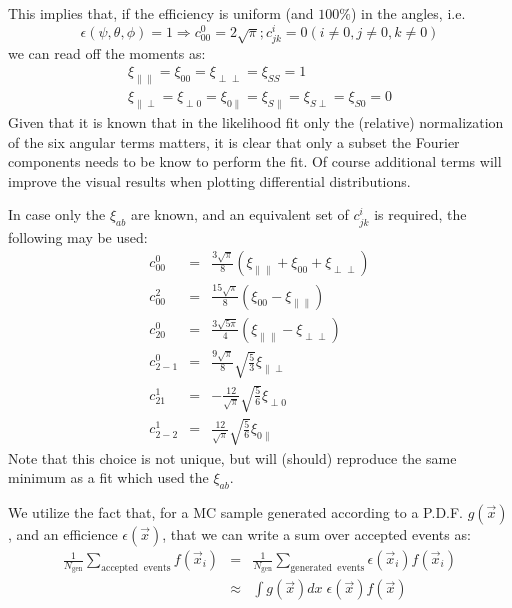 \documentclass[a4paper,10pt,twosided]{article}
\begin{document}
This implies that, if the efficiency is uniform (and $100\%$) in the angles, i.e.
\begin{equation}
   \epsilon(\psi,\theta,\phi) = 1 \Rightarrow c^0_{00} = 2\sqrt{\pi} ; c^{i}_{jk} = 0 (i\neq 0, j\neq 0, k \neq 0)
\end{equation}
we can read off the moments as:
\begin{eqnarray}
    \xi_{\parallel\parallel} = \xi_{00}= \xi_{\perp\perp} = \xi_{SS} = 1\\
    \xi_{\parallel\perp} =\xi_{\perp 0} = \xi_{0\parallel} =\xi_{S \parallel} = \xi_{S \perp} = \xi_{S 0} =0
\end{eqnarray}
Given that it is known that  in the likelihood fit only the (relative) normalization of the six angular
terms matters, it is clear that only a subset the Fourier components needs to be know to
perform the fit. Of course additional terms will improve the visual results when plotting 
differential distributions.

In case only the $\xi_{ab}$ are known, and an equivalent set of $c^i_{jk}$ is required, the 
following may be used:
\begin{eqnarray}
 c^0_{00}  &=& \frac{3\sqrt{\pi}}{8}( \xi_{\parallel \parallel }+\xi_{00}+\xi_{\perp\perp} )     \\
 c^2_{00}  &=& \frac{15\sqrt{\pi}}{8}( \xi_{00} - \xi_{\parallel \parallel } )    \\
 c^0_{20}  &=& \frac{3\sqrt{5\pi}}{4} ( \xi_{\parallel \parallel } - \xi_{\perp\perp} )    \\
 c^0_{2-1} &=& \frac{9\sqrt{\pi}}{8}\sqrt{\frac{5}{3}}  \xi_{\parallel \perp}    \\
 c^1_{21}  &=& - \frac{12}{\sqrt{\pi}}\sqrt{\frac{5}{6}} \xi_{\perp0}    \\
 c^1_{2-2} &=&   \frac{12}{\sqrt{\pi}}\sqrt{\frac{5}{6}}  \xi_{0\parallel }
\end{eqnarray}
Note that this choice is not unique, but will (should)  reproduce the same minimum as a fit which used
the $\xi_{ab}$.


\pagebreak

We utilize the fact that, for a MC sample generated according to a P.D.F. $g(\vec{x})$,
and an efficience $\epsilon(\vec{x})$, that we can write a sum over accepted events as:
\begin{eqnarray*}
  \frac{1}{N_{\mathrm{gen}}} \sum_{\mathrm{accepted \;\;events}} f(\vec{x}_i) &=& 
  \frac{1}{N_{\mathrm{gen}}} \sum_{\mathrm{generated \;\;events}} \epsilon(\vec{x}_i) f(\vec{x}_i) 
  \\ &\approx&  \int g(\vec{x})dx \; \epsilon(\vec{x}) f(\vec{x})
  \end{eqnarray*}
\end{document}
